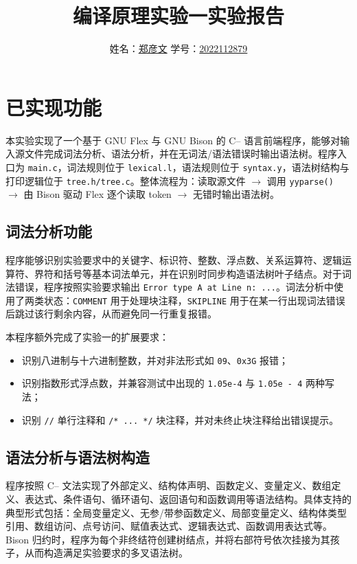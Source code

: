 \documentclass[11pt,a4paper]{ctexart}
\title{\vspace{-1.5em}编译原理实验一实验报告}
\author{%
  姓名：\underline{\hspace{4em}郑彦文}
  \quad
  学号：\underline{\hspace{7em}2022112879}
}
\date{\vspace{-1em}}
\newcommand{\code}[1]{\texttt{#1}}
\begin{document}
\maketitle
\thispagestyle{empty}

\section{已实现功能}
本实验实现了一个基于 GNU Flex 与 GNU Bison 的 C-- 语言前端程序，能够对输入源文件完成词法分析、语法分析，并在无词法/语法错误时输出语法树。程序入口为 \code{main.c}，词法规则位于 \code{lexical.l}，语法规则位于 \code{syntax.y}，语法树结构与打印逻辑位于 \code{tree.h/tree.c}。整体流程为：读取源文件 $\rightarrow$ 调用 \code{yyparse()} $\rightarrow$ 由 Bison 驱动 Flex 逐个读取 token $\rightarrow$ 无错时输出语法树。

\subsection{词法分析功能}
程序能够识别实验要求中的关键字、标识符、整数、浮点数、关系运算符、逻辑运算符、界符和括号等基本词法单元，并在识别时同步构造语法树叶子结点。对于词法错误，程序按照实验要求输出 \code{Error type A at Line n: ...}。词法分析中使用了两类状态：\code{COMMENT} 用于处理块注释，\code{SKIPLINE} 用于在某一行出现词法错误后跳过该行剩余内容，从而避免同一行重复报错。

本程序额外完成了实验一的扩展要求：
\begin{itemize}
  \item 识别八进制与十六进制整数，并对非法形式如 \code{09}、\code{0x3G} 报错；
  \item 识别指数形式浮点数，并兼容测试中出现的 \code{1.05e-4} 与 \code{1.05e - 4} 两种写法；
  \item 识别 \code{//} 单行注释和 \code{/* ... */} 块注释，并对未终止块注释给出错误提示。
\end{itemize}

\subsection{语法分析与语法树构造}
程序按照 C-- 文法实现了外部定义、结构体声明、函数定义、变量定义、数组定义、表达式、条件语句、循环语句、返回语句和函数调用等语法结构。具体支持的典型形式包括：全局变量定义、无参/带参函数定义、局部变量定义、结构体类型引用、数组访问、点号访问、赋值表达式、逻辑表达式、函数调用表达式等。Bison 归约时，程序为每个非终结符创建树结点，并将右部符号依次挂接为其孩子，从而构造满足实验要求的多叉语法树。
\end{document}
